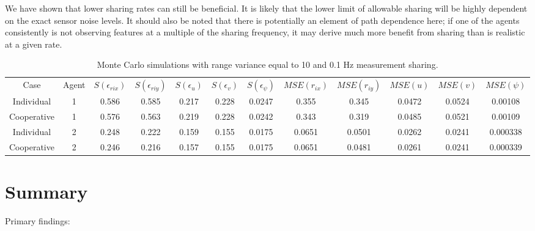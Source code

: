 \documentclass{aiaa-tc}
\begin{document}
We have shown that lower sharing rates can still be beneficial. It is likely that the lower limit of allowable sharing will be highly dependent on the exact sensor noise levels. It should also be noted that there is potentially an element of path dependence here; if one of the agents consistently is not observing features at a multiple of the sharing frequency, it may derive much more benefit from sharing than is realistic at a given rate.

\begin{table}[tb!]
\scriptsize
\centering
\begin{tabular}{c|c|c|c|c|c|c|c|c|c|c|c|}
Case & Agent & $S(\epsilon_{rix})$ & $S(\epsilon_{riy})$ & $S(\epsilon_{u})$ & $S(\epsilon_{v})$ & $S(\epsilon_{\psi})$ & $MSE(r_{ix})$ & $MSE(r_{iy})$ & $MSE(u)$ & $MSE(v)$ & $MSE(\psi)$ \\
Individual & 1& 0.586& 0.585& 0.217& 0.228& 0.0247& 0.355& 0.345& 0.0472& 0.0524& 0.00108 \\
Cooperative & 1& 0.576& 0.563& 0.219& 0.228& 0.0242& 0.343& 0.319& 0.0485& 0.0521& 0.00109 \\
Individual & 2& 0.248& 0.222& 0.159& 0.155& 0.0175& 0.0651& 0.0501& 0.0262& 0.0241& 0.000338 \\
Cooperative & 2& 0.246& 0.216& 0.157& 0.155& 0.0175& 0.0651& 0.0481& 0.0261& 0.0241& 0.000339 \\
\end{tabular}
\caption{Monte Carlo simulations with range variance equal to 10 and 0.1 Hz measurement sharing.}
\label{tab:.1Hz}
\end{table}

\pagebreak
\section{Summary}

Primary findings:
\end{document}
